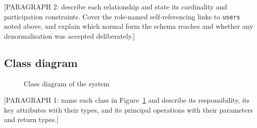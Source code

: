 [PARAGRAPH 2: describe each relationship and state its cardinality and
participation constraints. Cover the role-named self-referencing links
to \texttt{users} noted above, and explain which normal form the schema
reaches and whether any denormalisation was accepted deliberately.]


\subsection{Class diagram}
\label{subsec:class-diagram}

\begin{figure}[H]
  \centering
  \caption{Class diagram of the system}
  \label{fig:class-diagram}
\end{figure}

[PARAGRAPH 1: name each class in Figure~\ref{fig:class-diagram} and
describe its responsibility, its key attributes with their types, and
its principal operations with their parameters and return types.]

